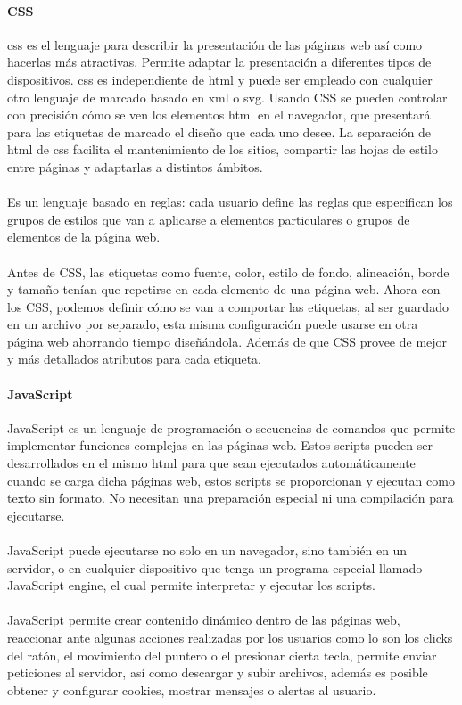 \documentclass[12pt, a4paper, titlepage]{report}
\begin{document}
			\paragraph{CSS\\}
			
			\acrfull{css} es el lenguaje para describir la presentación de las páginas web así como hacerlas más atractivas. Permite adaptar la presentación a diferentes tipos de dispositivos. \acrshort{css} es independiente de \acrshort{html} y puede ser empleado con cualquier otro lenguaje de marcado basado en \acrshort{xml} o \acrshort{svg}. Usando CSS se pueden controlar con precisión cómo se ven los elementos \acrshort{html} en el navegador, que presentará para las etiquetas de marcado el diseño que cada uno desee. La separación de \acrshort{html} de \acrshort{css} facilita el mantenimiento de los sitios, compartir las hojas de estilo entre páginas y adaptarlas a distintos ámbitos. \cite{refcss}\\\\
			Es un lenguaje basado en reglas: cada usuario define las reglas que especifican los grupos de estilos que van a aplicarse a elementos particulares o grupos de elementos de la página web.\\\\
			Antes de CSS, las etiquetas como fuente, color, estilo de fondo, alineación, borde y tamaño tenían que repetirse en cada elemento de una página web. Ahora con los CSS, podemos definir cómo se van a comportar las etiquetas, al ser guardado en un archivo por separado, esta misma configuración puede usarse en otra página web ahorrando tiempo diseñándola. Además de que CSS provee de mejor y más detallados atributos para cada etiqueta.
			
			\paragraph {JavaScript \\}
			
			JavaScript es un lenguaje de programación o secuencias de comandos que permite implementar funciones complejas en las páginas web. Estos scripts pueden ser desarrollados en el mismo \acrshort{html} para que sean ejecutados automáticamente cuando se carga dicha páginas web, estos scripts se proporcionan y ejecutan como texto sin formato. No necesitan una preparación especial ni una compilación para ejecutarse. \cite{refjs}\\\\
			JavaScript puede ejecutarse no solo en un navegador, sino también en un servidor, o en cualquier dispositivo que tenga un programa especial llamado JavaScript engine, el cual permite interpretar y ejecutar los scripts.\\\\
			JavaScript permite crear contenido dinámico dentro de las páginas web, reaccionar ante algunas acciones realizadas por los usuarios como lo son los clicks del ratón, el movimiento del puntero o el presionar cierta tecla, permite enviar peticiones al servidor, así como descargar y subir archivos, además es posible obtener y configurar cookies, mostrar mensajes o alertas al usuario.
		    
\end{document}
